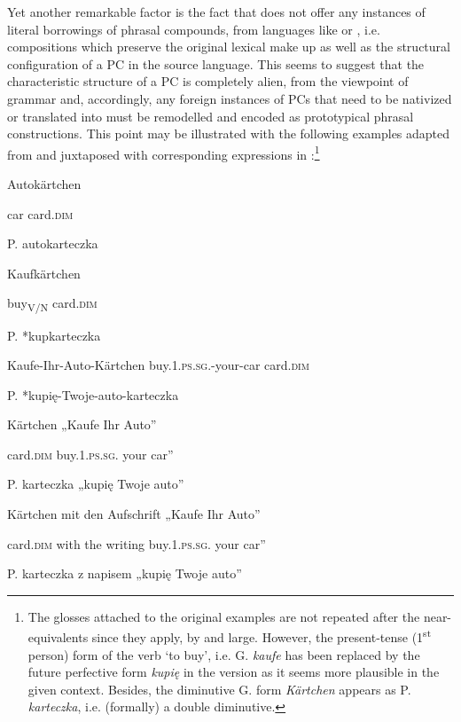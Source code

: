 \documentclass[output=paper]{LSP/langsci}
\begin{document}
{Yet another remarkable factor is the fact that  does not offer any instances of literal borrowings of phrasal compounds, from languages like  or , i.e. compositions which preserve the original lexical make up as well as the structural configuration of a PC in the source language. This seems to suggest that the characteristic structure of a PC is completely alien, from the viewpoint of  grammar and, accordingly, any foreign instances of PCs that need to be nativized} {or translated into  must be remodelled and encoded as prototypical phrasal constructions. This point may be illustrated with the following  examples adapted from \citet[250]{Meibauer2007} and juxtaposed with corresponding expressions in :}\footnote{{The  glosses attached to the original  examples are not repeated after the  near-equivalents since they apply, by and large. However, the present-tense (1}{\textsuperscript{st}} {person) form of the verb ‘to buy’, i.e. G.} {\textit{kaufe}} {has been replaced by the future perfective form} {\textit{kupię}} {in the  version as it seems more plausible in the given context. Besides, the diminutive G. form} {\textit{Kärtchen}} {appears as P.} {\textit{karteczka}}{, i.e. (formally) a double diminutive.}}


\ea%
    \label{ex:szymanek:12} 
          \citep[250]{Meibauer2007}
\ea 
Autokärtchen

 {car card.}{\textsc{dim}}


  P. autokarteczka


\ex   Kaufkärtchen

 {buy}{\textsubscript{V/N} }{card.}{\textsc{dim}}


  P. *kupkarteczka


\ex  Kaufe-Ihr-Auto-Kärtchen
{buy.}\textsc{1.ps.sg.}{-your-car card.}{\textsc{dim}}

  P. *kupię-Twoje-auto-karteczka


\ex  Kärtchen „Kaufe Ihr Auto”

{card.}{\textsc{dim}} {buy.}\textsc{1.ps.sg.} {your car”}

 {P. karteczka „kupię Twoje auto”}


\ex Kärtchen mit den Aufschrift „Kaufe Ihr Auto”

card.\textsc{dim} with the writing buy.\textsc{1.ps.sg.} your car”

 {P. karteczka z napisem „kupię Twoje auto”}
\end{document}
